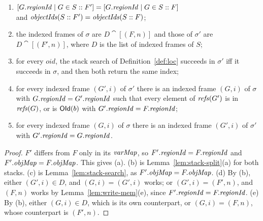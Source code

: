 \begin{lemma}
\label{lem:merge-frames}
\begin{enumerate}[nosep,label=(\alph*)]
  \item $[G.\mathit{regionId} \mid G \in S :: F'] = [G.\mathit{regionId} \mid G \in S :: F]$
    \\
    and $\mathit{objectIds}(S :: F') = \mathit{objectIds}(S :: F)$; 
  \item the indexed frames of $\sigma$ are $D \cat [(F, n)]$ and those of $\sigma'$ are
    $D \cat [(F', n)]$, where $D$ is the list of indexed frames of $S$;
  \item for every $oid$, the stack search of Definition~\ref{def:loc} succeeds in $\sigma'$ iff it
    succeeds in $\sigma$, and then both return the same index;
  \item for every indexed frame $(G', i)$ of $\sigma'$ there is an indexed frame $(G, i)$ of $\sigma$
    with $G.\mathit{regionId} = G'.\mathit{regionId}$ such that every element of $\mathit{refs}(G')$ is in $\mathit{refs}(G)$, or is $\mathsf{OId}(b)$ with $G'.\mathit{regionId} = F.\mathit{regionId}$;
  \item for every indexed frame $(G, i)$ of $\sigma$ there is an indexed frame $(G', i)$ of $\sigma'$
    with $G'.\mathit{regionId} = G.\mathit{regionId}$.
\end{enumerate}
\end{lemma}
\begin{proof}
$F'$ differs from $F$ only in its $\mathit{varMap}$, so $F'.\mathit{regionId} = F.\mathit{regionId}$ and $F'.\mathit{objMap} = F.\mathit{objMap}$. This gives
(a). (b) is Lemma~\ref{lem:stack-split}(a) for both stacks. (c) is
Lemma~\ref{lem:stack-search}, as $F'.\mathit{objMap} = F.\mathit{objMap}$. (d) By (b), either $(G', i) \in D$, and $(G, i) = (G', i)$ works; or
$(G', i) = (F', n)$, and $(F, n)$ works by Lemma~\ref{lem:write-mem}(e), since $F'.\mathit{regionId} = F.\mathit{regionId}$.
(e) By (b), either $(G, i) \in D$, which is its own counterpart, or $(G, i) = (F, n)$, whose
counterpart is $(F', n)$.
\end{proof}

